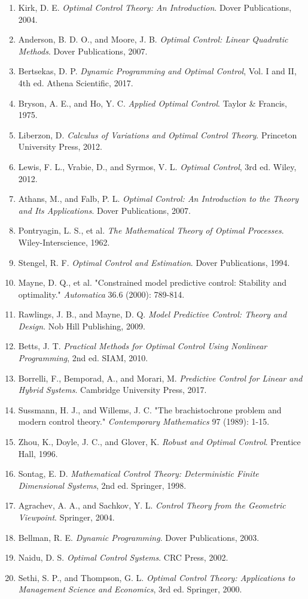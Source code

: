 \documentclass[a4paper, 11pt]{article}
\begin{document}
\begin{enumerate}
\item Kirk, D. E. \textit{Optimal Control Theory: An Introduction}. Dover Publications, 2004.
\item Anderson, B. D. O., and Moore, J. B. \textit{Optimal Control: Linear Quadratic Methods}. Dover Publications, 2007.
\item Bertsekas, D. P. \textit{Dynamic Programming and Optimal Control}, Vol. I and II, 4th ed. Athena Scientific, 2017.
\item Bryson, A. E., and Ho, Y. C. \textit{Applied Optimal Control}. Taylor \& Francis, 1975.
\item Liberzon, D. \textit{Calculus of Variations and Optimal Control Theory}. Princeton University Press, 2012.
\item Lewis, F. L., Vrabie, D., and Syrmos, V. L. \textit{Optimal Control}, 3rd ed. Wiley, 2012.
\item Athans, M., and Falb, P. L. \textit{Optimal Control: An Introduction to the Theory and Its Applications}. Dover Publications, 2007.
\item Pontryagin, L. S., et al. \textit{The Mathematical Theory of Optimal Processes}. Wiley-Interscience, 1962.
\item Stengel, R. F. \textit{Optimal Control and Estimation}. Dover Publications, 1994.
\item Mayne, D. Q., et al. "Constrained model predictive control: Stability and optimality." \textit{Automatica} 36.6 (2000): 789-814.
\item Rawlings, J. B., and Mayne, D. Q. \textit{Model Predictive Control: Theory and Design}. Nob Hill Publishing, 2009.
\item Betts, J. T. \textit{Practical Methods for Optimal Control Using Nonlinear Programming}, 2nd ed. SIAM, 2010.
\item Borrelli, F., Bemporad, A., and Morari, M. \textit{Predictive Control for Linear and Hybrid Systems}. Cambridge University Press, 2017.
\item Sussmann, H. J., and Willems, J. C. "The brachistochrone problem and modern control theory." \textit{Contemporary Mathematics} 97 (1989): 1-15.
\item Zhou, K., Doyle, J. C., and Glover, K. \textit{Robust and Optimal Control}. Prentice Hall, 1996.
\item Sontag, E. D. \textit{Mathematical Control Theory: Deterministic Finite Dimensional Systems}, 2nd ed. Springer, 1998.
\item Agrachev, A. A., and Sachkov, Y. L. \textit{Control Theory from the Geometric Viewpoint}. Springer, 2004.
\item Bellman, R. E. \textit{Dynamic Programming}. Dover Publications, 2003.
\item Naidu, D. S. \textit{Optimal Control Systems}. CRC Press, 2002.
\item Sethi, S. P., and Thompson, G. L. \textit{Optimal Control Theory: Applications to Management Science and Economics}, 3rd ed. Springer, 2000.
\end{enumerate}
\end{document}
